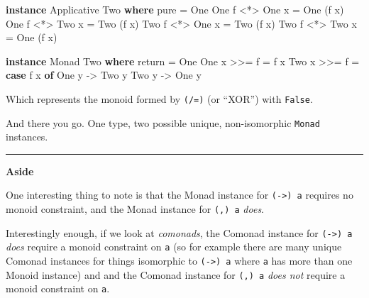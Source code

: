 \documentclass[]{article}
\newenvironment{Shaded}{}{}
\newcommand{\DataTypeTok}[1]{\textcolor[rgb]{0.56,0.13,0.00}{#1}}
\newcommand{\FunctionTok}[1]{\textcolor[rgb]{0.02,0.16,0.49}{#1}}
\newcommand{\KeywordTok}[1]{\textcolor[rgb]{0.00,0.44,0.13}{\textbf{#1}}}
\newcommand{\NormalTok}[1]{#1}
\newcommand{\OperatorTok}[1]{\textcolor[rgb]{0.40,0.40,0.40}{#1}}
\newcommand{\OtherTok}[1]{\textcolor[rgb]{0.00,0.44,0.13}{#1}}
\begin{document}
\begin{Shaded}
\begin{Highlighting}[]
\KeywordTok{instance} \DataTypeTok{Applicative} \DataTypeTok{Two} \KeywordTok{where}
    \FunctionTok{pure} \OtherTok{=} \DataTypeTok{One}
    \DataTypeTok{One}\NormalTok{ f }\OperatorTok{<*>} \DataTypeTok{One}\NormalTok{ x }\OtherTok{=} \DataTypeTok{One}\NormalTok{ (f x)}
    \DataTypeTok{One}\NormalTok{ f }\OperatorTok{<*>} \DataTypeTok{Two}\NormalTok{ x }\OtherTok{=} \DataTypeTok{Two}\NormalTok{ (f x)}
    \DataTypeTok{Two}\NormalTok{ f }\OperatorTok{<*>} \DataTypeTok{One}\NormalTok{ x }\OtherTok{=} \DataTypeTok{Two}\NormalTok{ (f x)}
    \DataTypeTok{Two}\NormalTok{ f }\OperatorTok{<*>} \DataTypeTok{Two}\NormalTok{ x }\OtherTok{=} \DataTypeTok{One}\NormalTok{ (f x)}

\KeywordTok{instance} \DataTypeTok{Monad} \DataTypeTok{Two} \KeywordTok{where}
    \FunctionTok{return} \OtherTok{=} \DataTypeTok{One}
    \DataTypeTok{One}\NormalTok{ x }\OperatorTok{>>=}\NormalTok{ f }\OtherTok{=}\NormalTok{ f x}
    \DataTypeTok{Two}\NormalTok{ x }\OperatorTok{>>=}\NormalTok{ f }\OtherTok{=} \KeywordTok{case}\NormalTok{ f x }\KeywordTok{of}
                    \DataTypeTok{One}\NormalTok{ y }\OtherTok{{-}>} \DataTypeTok{Two}\NormalTok{ y}
                    \DataTypeTok{Two}\NormalTok{ y }\OtherTok{{-}>} \DataTypeTok{One}\NormalTok{ y}
\end{Highlighting}
\end{Shaded}

Which represents the monoid formed by \texttt{(/=)} (or ``XOR'') with
\texttt{False}.

And there you go. One type, two possible unique, non-isomorphic \texttt{Monad}
instances.

\begin{center}\rule{0.5\linewidth}{\linethickness}\end{center}

\textbf{Aside}

One interesting thing to note is that the Monad instance for
\texttt{(-\textgreater{})\ a} requires no monoid constraint, and the Monad
instance for \texttt{(,)\ a} \emph{does}.

Interestingly enough, if we look at \emph{comonads}, the Comonad instance for
\texttt{(-\textgreater{})\ a} \emph{does} require a monoid constraint on
\texttt{a} (so for example there are many unique Comonad instances for things
isomorphic to \texttt{(-\textgreater{})\ a} where \texttt{a} has more than one
Monoid instance) and and the Comonad instance for \texttt{(,)\ a} \emph{does
not} require a monoid constraint on \texttt{a}.
\end{document}
